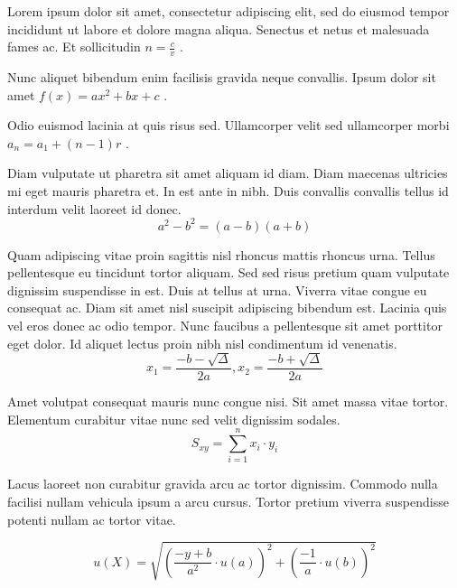 \documentclass{article}
\begin{document}
Lorem ipsum dolor sit amet, consectetur adipiscing elit, sed do eiusmod tempor incididunt ut labore et dolore magna aliqua. Senectus et netus et malesuada fames ac. Et sollicitudin 
\begin{math}
	n=\frac{c}{v}
\end{math}
.\newline
 
Nunc aliquet bibendum enim facilisis gravida neque convallis. Ipsum dolor sit amet 
$ f(x)=ax^2+bx+c $
.\newline
    
Odio euismod lacinia at quis risus sed. Ullamcorper velit sed ullamcorper morbi 
\( a_n=a_1+(n-1)r \)
.\newline

Diam vulputate ut pharetra sit amet aliquam id diam. Diam maecenas ultricies mi eget mauris pharetra et. In est ante in nibh. Duis convallis convallis tellus id interdum velit laoreet id donec. 
\[ a^2-b^2=(a-b)(a+b) \]

Quam adipiscing vitae proin sagittis nisl rhoncus mattis rhoncus urna. Tellus pellentesque eu tincidunt tortor aliquam. Sed sed risus pretium quam vulputate dignissim suspendisse in est. Duis at tellus at urna. Viverra vitae congue eu consequat ac. Diam sit amet nisl suscipit adipiscing bibendum est. Lacinia quis vel eros donec ac odio tempor. Nunc faucibus a pellentesque sit amet porttitor eget dolor. Id aliquet lectus proin nibh nisl condimentum id venenatis.
$$ x_1=\frac{-b-\sqrt{\Delta}}{2a},x_2=\frac{-b+\sqrt{\Delta}}{2a} $$

Amet volutpat consequat mauris nunc congue nisi. Sit amet massa vitae tortor. Elementum curabitur vitae nunc sed velit dignissim sodales. 
\begin{displaymath}
	S_{xy}=\sum_{i=1}^{n}x_i\cdot y_i
\end{displaymath}

Lacus laoreet non curabitur gravida arcu ac tortor dignissim. Commodo nulla facilisi nullam vehicula ipsum a arcu cursus. Tortor pretium viverra suspendisse potenti nullam ac tortor vitae. 

\begin{equation}
	u(X)=\sqrt{(\frac{-y+b}{a^2}\cdot u(a))^2+(\frac{-1}{a}\cdot u(b))^2}
\end{equation}
\end{document}
